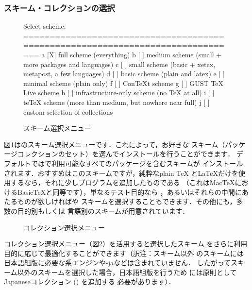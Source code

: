 \documentclass[uplatex,dvipdfmx]{jsarticle}
\begin{document}
\subsubsection{スキーム・コレクションの選択}
\label{sec:components}

\begin{figure}[tbh]
\begin{boxedverbatim}
Select scheme:
===============================================================================
 a [X] full scheme (everything)
 b [ ] medium scheme (small + more packages and languages)
 c [ ] small scheme (basic + xetex, metapost, a few languages)
 d [ ] basic scheme (plain and latex)
 e [ ] minimal scheme (plain only)
 f [ ] ConTeXt scheme
 g [ ] GUST TeX Live scheme
 h [ ] infrastructure-only scheme (no TeX at all)
 i [ ] teTeX scheme (more than medium, but nowhere near full)
 j [ ] custom selection of collections
\end{boxedverbatim}
\vspace{-1zh}
\caption{スキーム選択メニュー}\label{fig:scheme-text}
\end{figure}

図\ref{fig:scheme-text}は\TL のスキーム選択メニューです．これによって，お好きな
スキーム（パッケージコレクションのセット）を選んでインストールを行うことができます．
デフォルトでは\TL で利用可能なすべてのパッケージを含むスキームが
インストールされます．おすすめはこのスキームですが，純粋なplain \TeX
と\LaTeX だけを使用するなら，それに少しプログラムを追加したものである
（これはMac\TeX におけるBasic\TeX と同等です），単なるテスト目的なら
，あるいはそれらの中間にあたるものが欲しければや
スキームを選択することもできます．その他にも，多数の目的別もしくは
言語別のスキームが用意されています．

\begin{figure}[tb]
\centering {}
\caption{コレクション選択メニュー}\label{fig:collections-gui}
\end{figure}

コレクション選択メニュー（図\ref{fig:collections-gui}）を活用すると選択したスキーム
をさらに利用目的に応じて最適化することができます（訳注：スキーム以外
のスキームには日本語組版に必要な\pTeX 系エンジンや\LuaTeX-jaなどは含まれていません．
したがってスキーム以外のスキームを選択した場合，日本語組版を行うため
には原則としてJapaneseコレクション () を追加する
必要があります）．
\end{document}
